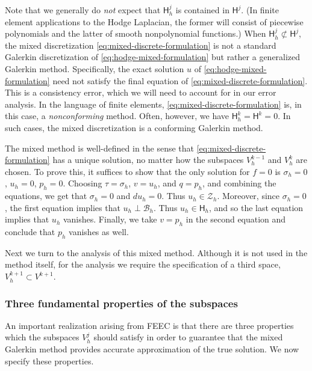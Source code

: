 {Note that we generally do \emph{not} expect that $\mathsf H_h^j$ is contained in $\mathsf H^j$. (In finite element applications to the Hodge Laplacian, the former will consist of piecewise polynomials and the latter of smooth nonpolynomial functions.) When $\mathsf H_h^j\not\subset\mathsf H^j$, the mixed discretization \eqref{eq:mixed-discrete-formulation} is not a standard Galerkin discretization of \eqref{eq:hodge-mixed-formulation} but rather a generalized Galerkin method. Specifically, the exact solution $u$ of \eqref{eq:hodge-mixed-formulation} need not satisfy the final equation of \eqref{eq:mixed-discrete-formulation}. This is a consistency error, which we will need to account for in our error analysis. In the language of finite elements, \eqref{eq:mixed-discrete-formulation} is, in this case, a \emph{nonconforming} method. Often, however, we have $\mathsf H_h^k=\mathsf H^k=0$. In such cases, the mixed discretization is a conforming Galerkin method.}

{The mixed method is well-defined in the sense that \eqref{eq:mixed-discrete-formulation} has a unique solution, no matter how the subspaces $V_h^{k-1}$ and $V_h^k$ are chosen. To prove this, it suffices to show that the only solution for $f=0$ is $\sigma_h=0$, $u_h=0$, $p_h=0$. Choosing $\tau=\sigma_h$, $v=u_h$, and $q=p_h$, and combining the equations, we get that $\sigma_h=0$ and $du_h=0$. Thus $u_h\in\mathcal Z_h$. Moreover, since $\sigma_h=0$, the first equation implies that $u_h\perp\mathcal B_h$. Thus $u_h\in\mathsf H_h$, and so the last equation implies that $u_h$ vanishes. Finally, we take $v=p_h$ in the second equation and conclude that $p_h$ vanishes as well.}

{Next we turn to the analysis of this mixed method. Although it is not used in the method itself, for the analysis we require the specification of a third space, $V_h^{k+1}\subset V^{k+1}$.}

\subsubsection{{Three fundamental properties of the subspaces}}\label{subsec:mixed-three-properties}

{An important realization arising from FEEC is that there are three properties which the subspaces $V_h^j$ should satisfy in order to guarantee that the mixed Galerkin method provides accurate approximation of the true solution. We now specify these properties.}

